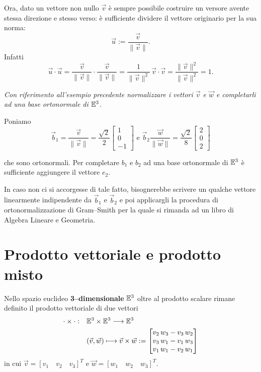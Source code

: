 Ora, dato un vettore non nullo $\vec v$ è sempre possibile costruire un 
versore avente 
stessa direzione e stesso verso: è sufficiente dividere il vettore originario
per la sua norma:
\[
  \vec u := \frac{\vec v}{\|\vec v\|}.
\]
Infatti
\[
  \vec u\cdot \vec u = \frac{\vec v}{\|\vec v\|}\cdot \frac{\vec v}{\|\vec v\|} 
  = \frac{1}{\|\vec v\|^2}\, \vec v\cdot \vec v = \frac{\|\vec v\|^2}{\|\vec 
v\|^2} = 1.
\]
\begin{esempio}
  \textit{Con riferimento all'esempio precedente normalizzare i vettori $\vec 
v$ e $\vec w$
  e completarli ad una base ortonormale di $\mathbb{E}^{3}$.}
\end{esempio}
\begin{sol}
  Poniamo
  \[
  \vec b_1 = \frac{\vec v}{\|\vec v\|} = \frac{\sqrt 2}{2} \begin{bmatrix} 
1\\0\\-1 \end{bmatrix}
  \textrm{ e } 
  \vec b_2 \frac{\vec w}{\|\vec w\|} = \frac{\sqrt 2}{8} \begin{bmatrix} 
2\\0\\2 \end{bmatrix}\]
  
  che sono ortonormali. Per completare $b_1$ e $b_2$ ad una base ortonormale di 
  $\mathbb{E}^{3}$ è sufficiente aggiungere il vettore $e_2$.
  
  In caso non ci si accorgesse di tale fatto, bisognerebbe scrivere un qualche 
vettore 
  linearmente indipendente da $\vec b_1$ e $\vec b_2$ e poi applicargli la 
procedura 
  di ortonormalizzazione di Gram--Smith  per la quale si rimanda ad un libro di 
  Algebra Lineare e Geometria.
\end{sol}

\section{Prodotto vettoriale e prodotto misto}
Nello spazio euclideo \textbf{3--dimensionale} $\mathbb{E}^{3}$ oltre al prodotto 
scalare
rimane definito il prodotto  vettoriale di due vettori
\[\begin{aligned}
  \cdot \times \cdot : & \quad \mathbb{E}^{3}\times\mathbb{E}^{3} \longrightarrow \mathbb{E}^{3} \\
     & \quad (\vec v,\vec w) \longmapsto \vec v\times\vec w:=
     \begin{bmatrix} 
        v_2\,w_3 - v_3\,w_2 \\
        v_3\,w_1 - v_1\,w_3 \\
        v_1\,w_1-v_2\,w_1
     \end{bmatrix}
\end{aligned}\]     
in cui $\vec v = [v_1\quad v_2\quad v_3]^T$ e $\vec w = [w_1\quad w_2 \quad 
w_3]^T$.

